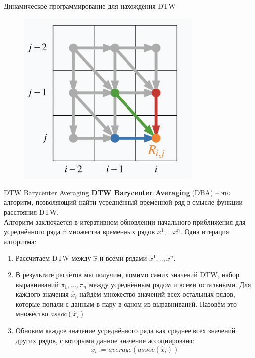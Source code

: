 \begin{frame}{Динамическое программирование для нахождения DTW}
\begin{figure}
    \centering
    \includegraphics[width=0.8\textwidth]{lecture_7/figs/dtw_transitions.png}
\end{figure}
\end{frame}
\begin{frame}{DTW Barycenter Averaging}
\textbf{DTW Barycenter Averaging} (DBA) -- это алгоритм, позволяющий найти усреднённый временной ряд в смысле функции расстояния DTW. \\
Алгоритм заключается в итеративном обновлении начального приближения для усреднённого ряда $\hat{x}$ множества временных рядов $x^1, ... x^n$. Одна итерация алгоритма:
\begin{enumerate}
    \item Рассчитаем DTW между $\hat{x}$ и всеми рядами $x^1, .., x^n$.
    \item В результате расчётов мы получим, помимо самих значений DTW, набор выравниваний $\pi_1, ..., \pi_n$ между усреднённым рядом и всеми остальными. Для каждого значения $\hat{x}_i$ найдём множество значений всех остальных рядов, которые попали с данным в пару в одном из выравниваний. Назовём это множество $assoc(\hat{x}_i)$
    \item Обновим каждое значение усреднённого ряда как среднее всех значений других рядов, с которыми данное значение ассоциировано:
    $$ \hat{x}_i := average(assoc(\hat{x}_i)) $$
\end{enumerate}

\end{frame}

